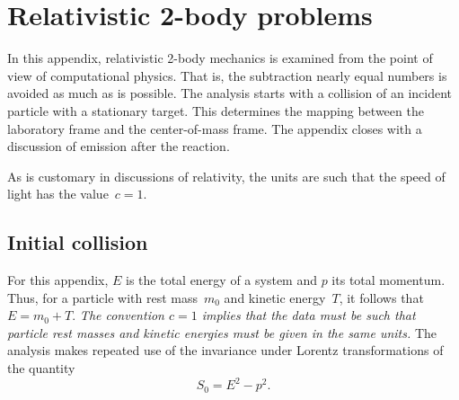 { %
\newcommand{\Tlabin}{T_{i,\textrm{lab}}}
\newcommand{\plabin}{p_{i,\textrm{lab}}}
\newcommand{\plaba}{p_{\textrm{lab},1}}
\newcommand{\plabb}{p_{\textrm{lab},2}}
\newcommand{\plabc}{p_{\textrm{lab},3}}
\newcommand{\Tlabe}{T_{e,\textrm{lab}}}
\newcommand{\plabe}{p_{e,\textrm{lab}}}
\newcommand{\plabea}{p_{e,\textrm{lab},1}}
\newcommand{\plabeb}{p_{e,\textrm{lab},2}}
\newcommand{\plabec}{p_{e,\textrm{lab},3}}
\newcommand{\Tcmi}{T_{i,\textrm{cm}}}
\newcommand{\Tcmt}{T_{t,\textrm{cm}}}
\newcommand{\Tcme}{T_{e,\textrm{cm}}}
\newcommand{\Tcmr}{T_{r,\textrm{cm}}}
\newcommand{\pcmi}{p_{i,\textrm{cm}}}
\newcommand{\pcma}{p_{\textrm{cm},1}}
\newcommand{\pcmb}{p_{\textrm{cm},2}}
\newcommand{\pcmc}{p_{\textrm{cm},3}}
\newcommand{\pcme}{p_{e,\textrm{cm}}}
\newcommand{\pcmea}{p_{e,\textrm{cm},1}}
\newcommand{\pcmeb}{p_{e,\textrm{cm},2}}
\newcommand{\pcmec}{p_{e,\textrm{cm},3}}
\newcommand{\pcmta}{p_{t,\textrm{cm},1}}
\newcommand{\pcmia}{p_{i,\textrm{cm},1}}

\chapter{Relativistic 2-body problems}
\label{Appendix-relativity}
In this appendix, relativistic 2-body mechanics is examined from the point
of view of computational physics.  That is, the subtraction
nearly equal numbers is avoided as much as is possible.
The analysis starts with a collision of an incident particle with
a stationary target.  This determines the mapping between
the laboratory frame and the center-of-mass frame.  
The appendix closes with a discussion of
emission after the reaction. 

As is customary in discussions of relativity, the units are
such that the speed of light has the value~$c = 1$.

\section{Initial collision}
For this appendix, $E$ is the total energy of
a system
and $p$ its total momentum.  Thus, for a particle with rest mass~$m_0$
and kinetic energy~$T$, it follows that $E = m_0 + T$. 
\textit{The convention $c = 1$ implies that the data must be such that
particle rest masses and kinetic energies must be given in the same units.}
The analysis makes repeated use of the invariance under Lorentz
transformations of the quantity
\begin{equation}
  S_0 = E^2 - p^2.
  \label{spacetime}
\end{equation}

}
